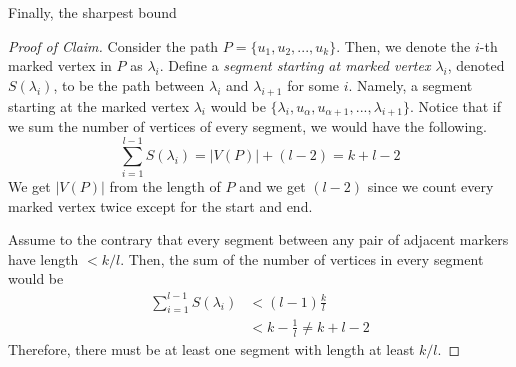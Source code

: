 \begin{hwproblem}{6}
  Finally, the sharpest bound

  \begin{proof}[Proof of Claim]
    Consider the path \(P = \{u_1, u_2, ..., u_k\}\). Then, we denote the
    \(i\)-th marked vertex in \(P\) as \(\lambda_i\). Define a \textit{segment
    starting at marked vertex \(\lambda_i\)}, denoted \(S(\lambda_i)\),
    to be the path between \(\lambda_{i}\) and \(\lambda_{i+1}\) for some
    \(i\). Namely, a segment starting at the marked vertex \(\lambda_i\) would
    be \(\{\lambda_i, u_{\alpha}, u_{\alpha+1}, ..., \lambda_{i+1}\}\).
    Notice that if we sum the number of vertices of every segment, we would have
    the following.
    \[ \sum_{i=1}^{l-1} S(\lambda_i) = |V(P)| + (l - 2) = k+l-2 \]
    We get \(|V(P)|\) from the length of \(P\) and we get \((l-2)\) since we 
    count every marked vertex twice except for the start and end.

    Assume to the contrary that every segment between any pair of
    adjacent markers have length \(< k/l\). Then, the sum of the number of
    vertices in every segment would be
    \[
      \begin{aligned}
        \sum_{i=1}^{l-1} S(\lambda_i) &< (l-1)\frac{k}{l} \\
                                      &< k - \frac{1}{l} \neq k+l-2
      \end{aligned}
    \]
    Therefore, there must be at least one segment with length at least \(k/l\).
  \end{proof}
\end{hwproblem}
